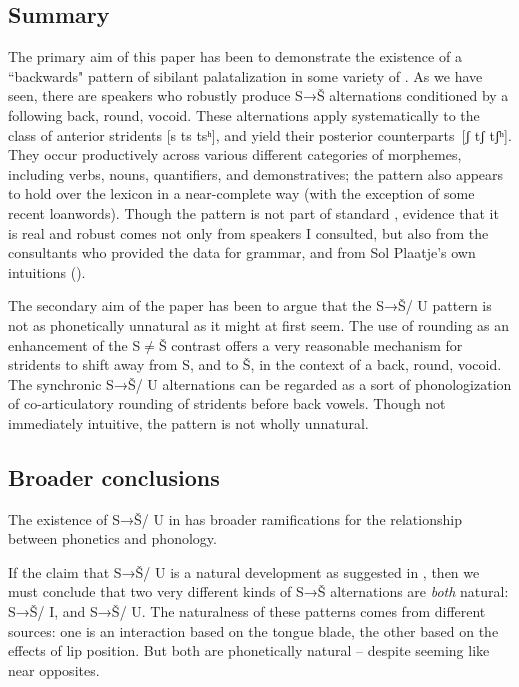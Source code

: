 \documentclass[output=paper,newtxmath,modfonts,nonflat]{langsci/langscibook}
\begin{document}
\subsection{Summary}\label{sec:bennett:5.1}

The primary aim of this paper has been to demonstrate the existence of a ``backwards" pattern of sibilant palatalization in some variety of . As we have seen, there are speakers who robustly produce S→Š alternations conditioned by a following back, round, vocoid. These alternations apply systematically to the class of anterior stridents [s ts tsʰ], and yield their posterior counterparts\linebreak\ [ʃ tʃ tʃʰ]. They occur productively across various different categories of morphemes, including verbs, nouns, quantifiers, and demonstratives; the pattern also appears to hold over the lexicon in a near-complete way (with the exception of some recent loanwords). Though the pattern is not part of standard , evidence that it is real and robust comes not only from speakers I consulted, but also from the consultants who provided the data for  grammar, and from Sol Plaatje’s own intuitions (\citealt{Jones&Plaatje1916}).

The secondary aim of the paper has been to argue that the S→Š/ {\longrule} U pattern is not as phonetically unnatural as it might at first seem. The use of rounding as an enhancement of the S${\neq}$Š contrast offers a very reasonable mechanism for stridents to shift away from S, and to Š, in the context of a back, round, vocoid. The synchronic S→Š/ {\longrule} U alternations can be regarded as a sort of phonologization of co-articulatory rounding of stridents before back vowels. Though not immediately intuitive, the pattern is not wholly unnatural.

\subsection{Broader conclusions}\label{sec:bennett:5.2}

The existence of S→Š/ {\longrule} U in  has broader ramifications for the relationship between phonetics and phonology. 

If the claim that S→Š/ {\longrule} U is a natural development as suggested in , then we must conclude that two very different kinds of S→Š alternations are \textit{both} natural: S→Š/ {\longrule} I, and S→Š/ {\longrule} U. The naturalness of these patterns comes from different sources: one is an interaction based on the tongue blade, the other based on the effects of lip position. But both are phonetically natural – despite seeming like near opposites. 
\end{document}
